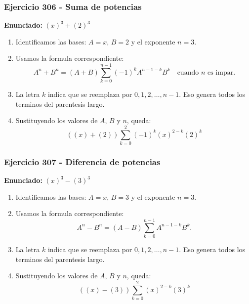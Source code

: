 \documentclass[11pt,a4paper]{article}
\begin{document}
\subsubsection*{Ejercicio 306 - Suma de potencias}
\textbf{Enunciado:} $ \left(x\right)^{3}+\left(2\right)^{3} $\par
\begin{enumerate}[leftmargin=2em]
\item Identificamos las bases: \(A=x\), \(B=2\) y el exponente \(n=3\).
\item Usamos la formula correspondiente: \[A^n+B^n=(A+B)\sum_{k=0}^{n-1}(-1)^kA^{n-1-k}B^k\quad\text{cuando }n\text{ es impar}.\]
\item La letra \(k\) indica que se reemplaza por \(0,1,2,\ldots,n-1\). Eso genera todos los terminos del parentesis largo.
\item Sustituyendo los valores de \(A\), \(B\) y \(n\), queda: \[\boxed{\left(\left(x\right)+\left(2\right)\right)\sum_{k=0}^{2}(-1)^k\left(x\right)^{2-k}\left(2\right)^k}\]
\end{enumerate}

\vspace{0.2cm}
\subsubsection*{Ejercicio 307 - Diferencia de potencias}
\textbf{Enunciado:} $ \left(x\right)^{3}-\left(3\right)^{3} $\par
\begin{enumerate}[leftmargin=2em]
\item Identificamos las bases: \(A=x\), \(B=3\) y el exponente \(n=3\).
\item Usamos la formula correspondiente: \[A^n-B^n=(A-B)\sum_{k=0}^{n-1}A^{n-1-k}B^k.\]
\item La letra \(k\) indica que se reemplaza por \(0,1,2,\ldots,n-1\). Eso genera todos los terminos del parentesis largo.
\item Sustituyendo los valores de \(A\), \(B\) y \(n\), queda: \[\boxed{\left(\left(x\right)-\left(3\right)\right)\sum_{k=0}^{2}\left(x\right)^{2-k}\left(3\right)^k}\]
\end{enumerate}

\vspace{0.2cm}
\end{document}
